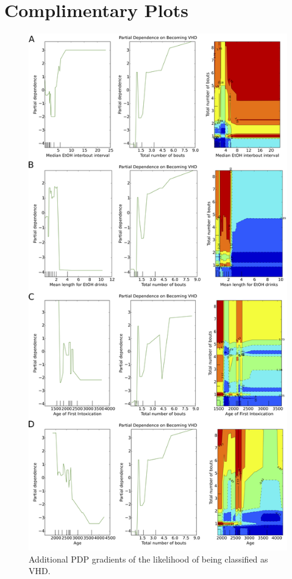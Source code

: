 \chapter{Complimentary Plots}



\begin{figure}[ht]
	\centering
	\includegraphics[width=0.7\linewidth]{figures/pdp_vhd.png}
	\caption{Additional PDP gradients of the likelihood of being classified as VHD.}
	\label{fig:VHD_gradients}
\end{figure}

